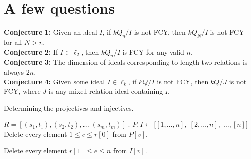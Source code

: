 \documentclass{article}
\begin{document}
\begin{flushleft}
\begin{center}
   \end{center}
   \section{A few questions}
   \textbf{Conjecture 1:} Given an ideal $I$, if $kQ_n/I$ is not FCY, then $kQ_N/I$ is not FCY for all $N > n$. \\
   \textbf{Conjecture 2:} If $I \in \ell_2$, then $kQ_n / I$ is FCY for any valid $n$. \\
   \textbf{Conjecture 3:} The dimension of ideals corresponding to length two relations is always $2n$. \\
   \textbf{Conjecture 4:} Given some ideal $I \in \ell_k$, if $kQ/I$ is not FCY, then $kQ/J$ is not FCY, 
   where $J$ is any mixed relation ideal containing $I$.
\end{flushleft}

\begin{algorithm}
   \begin{algorithmic}[1]
      \caption{Determining the projectives and injectives.}
      \Require $R = [(s_1, t_1), (s_2, t_2), \ldots, (s_m, t_m)]$ .
      \State $P, I \gets \big[[1, \ldots, n],\; [2, \ldots, n],\; \ldots, [n]\big]$ 
      \State Delete every element $1 \leq e \leq r[0]$ from $P[v]$. 
      \EndFor

      \State Delete every element $r[1] \leq e \leq n$ from $I[v]$. 
      \EndFor
      \EndFor
   \end{algorithmic}
\end{algorithm}
\end{document}
